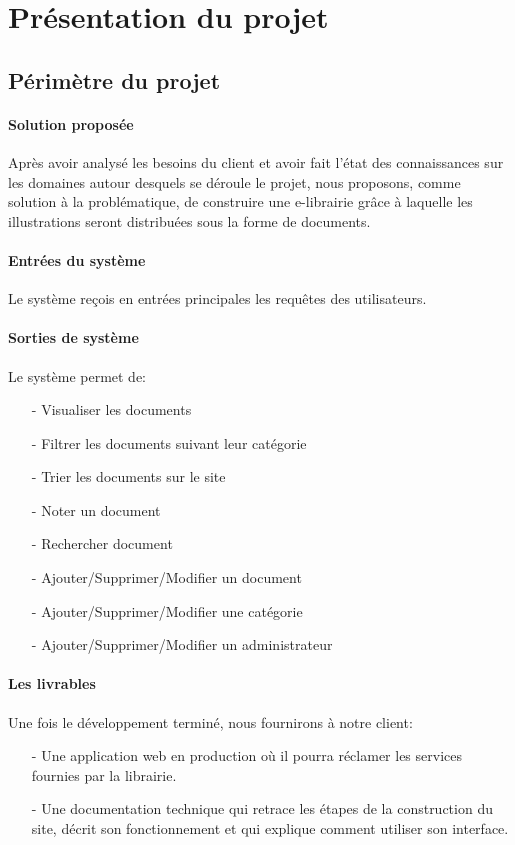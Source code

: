 \chapter{Pr\'esentation du projet}


	\section{P\'erim\`etre du projet \cite{PerimetreDUnProjet}}
		 \subsubsection{Solution propos\'ee}
		 	Apr\`es avoir analys\'e les besoins du client et avoir fait l'\'etat des connaissances sur les domaines autour desquels se d\'eroule le projet, nous proposons, comme solution \`a la probl\'ematique, de construire une e-librairie gr\^ace \`a laquelle les illustrations seront distribu\'ees sous la forme de documents.

		\subsubsection{Entr\'ees du syst\`eme}
			Le syst\`eme re\c{c}ois en entr\'ees principales les requ\^etes des utilisateurs.

		\subsubsection{Sorties de syst\`eme}
			Le syst\`eme permet de:
			\begin{itemize}
				\item[-] Visualiser les documents
				\item[-] Filtrer les documents suivant leur cat\'egorie
				\item[-] Trier les documents sur le site
				\item[-] Noter un document
				\item[-] Rechercher document
				\item[-] Ajouter/Supprimer/Modifier un document
				\item[-] Ajouter/Supprimer/Modifier une cat\'egorie
				\item[-] Ajouter/Supprimer/Modifier un administrateur
			\end{itemize}

		\subsubsection{Les livrables}
			Une fois le d\'eveloppement termin\'e, nous fournirons \`a notre client:
				\begin{itemize}
					\item[-] Une application web en production o\`u il pourra r\'eclamer les services fournies par la librairie.
					\item[-] Une documentation technique qui retrace les \'etapes de la construction du site, d\'ecrit son fonctionnement et qui explique comment utiliser son interface.
				\end{itemize}


